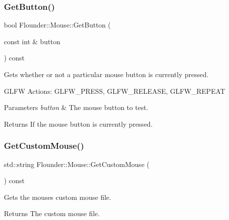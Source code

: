 \subsubsection{\texorpdfstring{Get\+Button()}{GetButton()}}
{\footnotesize\ttfamily bool Flounder\+::\+Mouse\+::\+Get\+Button (\begin{DoxyParamCaption}\item[{const int \&}]{button }\end{DoxyParamCaption}) const}



Gets whether or not a particular mouse button is currently pressed. 

G\+L\+FW Actions\+: G\+L\+F\+W\+\_\+\+P\+R\+E\+SS, G\+L\+F\+W\+\_\+\+R\+E\+L\+E\+A\+SE, G\+L\+F\+W\+\_\+\+R\+E\+P\+E\+AT


\begin{DoxyParams}{Parameters}
{\em button} & The mouse button to test. \\
\hline
\end{DoxyParams}
\begin{DoxyReturn}{Returns}
If the mouse button is currently pressed. 
\end{DoxyReturn}
\mbox{\label{class_flounder_1_1_mouse_a4854cfce7fb9b2322d275c38d671a38b}} 
\subsubsection{\texorpdfstring{Get\+Custom\+Mouse()}{GetCustomMouse()}}
{\footnotesize\ttfamily std\+::string Flounder\+::\+Mouse\+::\+Get\+Custom\+Mouse (\begin{DoxyParamCaption}{ }\end{DoxyParamCaption}) const\hspace{0.3cm}{\ttfamily [inline]}}



Gets the mouses custom mouse file. 

\begin{DoxyReturn}{Returns}
The custom mouse file. 
\end{DoxyReturn}
\mbox{\label{class_flounder_1_1_mouse_a3981eb9677ebdc9979da0508bc1787d2}} 
